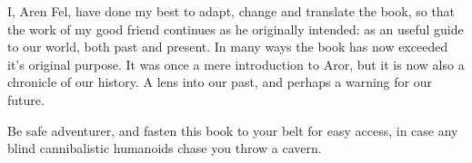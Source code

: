 I, Aren Fel, have done my best to adapt, change and translate the
book, so that the work of my good friend continues as he originally
intended: as an useful guide to our world, both past and present. In
many ways the book has now exceeded it's original purpose. It was once
a mere introduction to Aror, but it is now also a chronicle of our
history. A lens into our past, and perhaps a warning for our future.

Be safe adventurer, and fasten this book to your belt for easy access,
in case any blind cannibalistic humanoids chase you throw a cavern.
